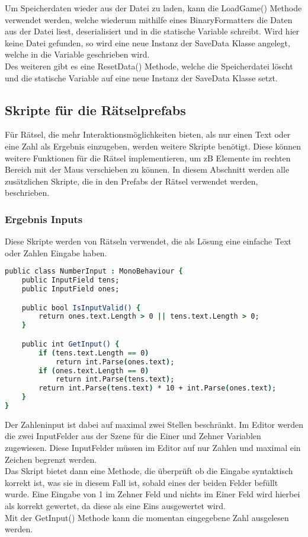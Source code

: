 {Um Speicherdaten wieder aus der Datei zu laden, kann die LoadGame() Methode verwendet werden, welche wiederum mithilfe eines BinaryFormatters die Daten aus der Datei liest, deserialisiert und in die statische Variable schreibt. Wird hier keine Datei gefunden, so wird eine neue Instanz der SaveData Klasse angelegt, welche in die Variable geschrieben wird.\\

Des weiteren gibt es eine ResetData() Methode, welche die Speicherdatei löscht und die statische Variable auf eine neue Instanz der SaveData Klasse setzt.

\subsection{Skripte für die Rätselprefabs}
Für Rätsel, die mehr Interaktionsmöglichkeiten bieten, als nur einen Text oder eine Zahl als Ergebnis einzugeben, werden weitere Skripte benötigt. Diese können weitere Funktionen für die Rätsel implementieren, um zB Elemente im rechten Bereich mit der Maus verschieben zu können. In diesem Abschnitt werden alle zusätzlichen Skripte, die in den Prefabs der Rätsel verwendet werden, beschrieben.

\subsubsection{Ergebnis Inputs}
Diese Skripte werden von Rätseln verwendet, die als Lösung eine einfache Text oder Zahlen Eingabe haben. \\
\begin{lstlisting}[language=csh, caption={Skript für einen zweistelligen Zahlen Input}]
public class NumberInput : MonoBehaviour {
    public InputField tens;
    public InputField ones;

    public bool IsInputValid() {
        return ones.text.Length > 0 || tens.text.Length > 0;
    }

    public int GetInput() {
        if (tens.text.Length == 0)
            return int.Parse(ones.text);
        if (ones.text.Length == 0)
            return int.Parse(tens.text);
        return int.Parse(tens.text) * 10 + int.Parse(ones.text);
    }
}
\end{lstlisting}
Der Zahleninput ist dabei auf maximal zwei Stellen beschränkt. Im Editor werden die zwei InputFelder aus der Szene für die Einer und Zehner Variablen zugewiesen. Diese InputFelder müssen im Editor auf nur Zahlen und maximal ein Zeichen begrenzt werden.\\
Das Skript bietet dann eine Methode, die überprüft ob die Eingabe syntaktisch korrekt ist, was sie in diesem Fall ist, sobald eines der beiden Felder befüllt wurde. Eine Eingabe von 1 im Zehner Feld und nichts im Einer Feld wird hierbei als korrekt gewertet, da diese als eine Eins ausgewertet wird.\\
Mit der GetInput() Methode kann die momentan eingegebene Zahl ausgelesen werden.\\

}
